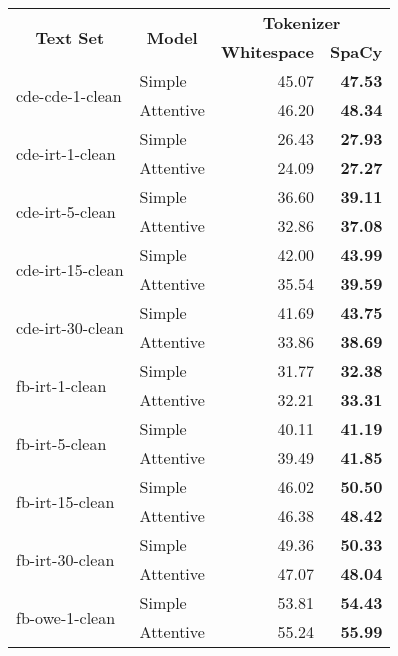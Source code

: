 \begin{tabular}{| l | l | r | r |}
    \hline

    \multicolumn{1}{|c|}{\multirow{2}{*}{\textbf{Text Set}}} &
    \multicolumn{1}{|c|}{\multirow{2}{*}{\textbf{Model}}} &
    \multicolumn{2}{|c|}{\textbf{Tokenizer}} \\

    &
    &
    \multicolumn{1}{|c|}{\textbf{Whitespace}} &
    \multicolumn{1}{|c|}{\textbf{SpaCy}} \\

    \hline \hline

    \multirow{2}{*}{cde-cde-1-clean}
    & Simple    & 45.07 & \textbf{47.53} \\
    & Attentive & 46.20 & \textbf{48.34} \\ \hline

    \multirow{2}{*}{cde-irt-1-clean}
    & Simple    & 26.43 & \textbf{27.93} \\
    & Attentive & 24.09 & \textbf{27.27} \\ \hline

    \multirow{2}{*}{cde-irt-5-clean}
    & Simple    & 36.60 & \textbf{39.11} \\
    & Attentive & 32.86 & \textbf{37.08} \\ \hline

    \multirow{2}{*}{cde-irt-15-clean}
    & Simple    & 42.00 & \textbf{43.99} \\
    & Attentive & 35.54 & \textbf{39.59} \\ \hline

    \multirow{2}{*}{cde-irt-30-clean}
    & Simple    & 41.69 & \textbf{43.75} \\
    & Attentive & 33.86 & \textbf{38.69} \\ \hline \hline

    \multirow{2}{*}{fb-irt-1-clean}
    & Simple    & 31.77 & \textbf{32.38} \\
    & Attentive & 32.21 & \textbf{33.31} \\ \hline

    \multirow{2}{*}{fb-irt-5-clean}
    & Simple    & 40.11 & \textbf{41.19} \\
    & Attentive & 39.49 & \textbf{41.85} \\ \hline

    \multirow{2}{*}{fb-irt-15-clean}
    & Simple    & 46.02 & \textbf{50.50} \\
    & Attentive & 46.38 & \textbf{48.42} \\ \hline

    \multirow{2}{*}{fb-irt-30-clean}
    & Simple    & 49.36 & \textbf{50.33} \\
    & Attentive & 47.07 & \textbf{48.04} \\ \hline

    \multirow{2}{*}{fb-owe-1-clean}
    & Simple    & 53.81 & \textbf{54.43} \\
    & Attentive & 55.24 & \textbf{55.99} \\ \hline

\end{tabular}
